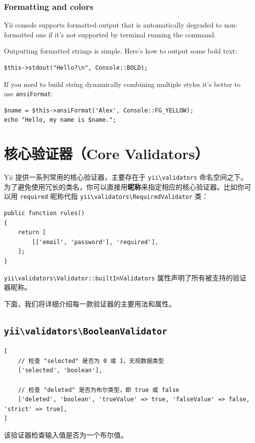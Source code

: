 \subsubsection{Formatting and colors}
Yii console supports formatted output that is automatically degraded to non-formatted one if it's not supported
by terminal running the command.

Outputting formatted strings is simple. Here's how to output some bold text:

\lstset{language=php}\begin{lstlisting}
$this->stdout("Hello?\n", Console::BOLD);
\end{lstlisting}
If you need to build string dynamically combining multiple styles it's better to use \lstinline|ansiFormat|:

\lstset{language=php}\begin{lstlisting}
$name = $this->ansiFormat('Alex', Console::FG_YELLOW);
echo "Hello, my name is $name.";
\end{lstlisting}


\label{tutorial-core-validators.md}\section{核心验证器（Core Validators）}
Yii 提供一系列常用的核心验证器，主要存在于 \lstinline|yii\validators| 命名空间之下。为了避免使用冗长的类名，你可以直接用\textbf{昵称}来指定相应的核心验证器。比如你可以用 \lstinline|required| 昵称代指 \texttt{yii{\allowbreak{}\textbackslash}validators{\allowbreak{}\textbackslash}RequiredValidator} 类：

\lstset{language=php}\begin{lstlisting}
public function rules()
{
    return [
        [['email', 'password'], 'required'],
    ];
}
\end{lstlisting}
\texttt{yii{\allowbreak{}\textbackslash}validators{\allowbreak{}\textbackslash}Validator\allowbreak{}::\allowbreak{}builtInValidators} 属性声明了所有被支持的验证器昵称。

下面，我们将详细介绍每一款验证器的主要用法和属性。

\subsection{\texttt{yii{\allowbreak{}\textbackslash}validators{\allowbreak{}\textbackslash}BooleanValidator} \label{tutorial-core-validators.md::boolean}}
\lstset{language=php}\begin{lstlisting}
[
    // 检查 "selected" 是否为 0 或 1，无视数据类型
    ['selected', 'boolean'],

    // 检查 "deleted" 是否为布尔类型，即 true 或 false
    ['deleted', 'boolean', 'trueValue' => true, 'falseValue' => false, 'strict' => true],
]
\end{lstlisting}
该验证器检查输入值是否为一个布尔值。

